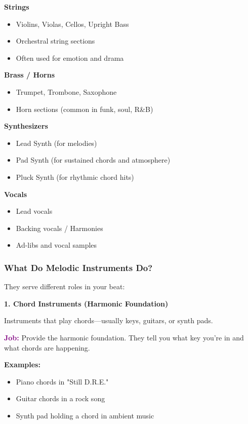 \documentclass[11pt,letterpaper]{article}
\newcommand{\purple}[1]{\textcolor{purple}{\textbf{#1}}}
\begin{document}
\textbf{Strings}
\begin{itemize}[leftmargin=*]
\item Violins, Violas, Cellos, Upright Bass
\item Orchestral string sections
\item Often used for emotion and drama
\end{itemize}

\textbf{Brass / Horns}
\begin{itemize}[leftmargin=*]
\item Trumpet, Trombone, Saxophone
\item Horn sections (common in funk, soul, R\&B)
\end{itemize}

\textbf{Synthesizers}
\begin{itemize}[leftmargin=*]
\item Lead Synth (for melodies)
\item Pad Synth (for sustained chords and atmosphere)
\item Pluck Synth (for rhythmic chord hits)
\end{itemize}

\textbf{Vocals}
\begin{itemize}[leftmargin=*]
\item Lead vocals
\item Backing vocals / Harmonies
\item Ad-libs and vocal samples
\end{itemize}

\subsubsection{What Do Melodic Instruments Do?}

They serve different roles in your beat:

\textbf{1. Chord Instruments (Harmonic Foundation)}

Instruments that play chords—usually keys, guitars, or synth pads.

\textbf{\purple{Job:}} Provide the harmonic foundation. They tell you what key you're in and what chords are happening.

\textbf{Examples:}
\begin{itemize}[leftmargin=*]
\item Piano chords in "Still D.R.E."
\item Guitar chords in a rock song
\item Synth pad holding a chord in ambient music
\end{itemize}
\end{document}
